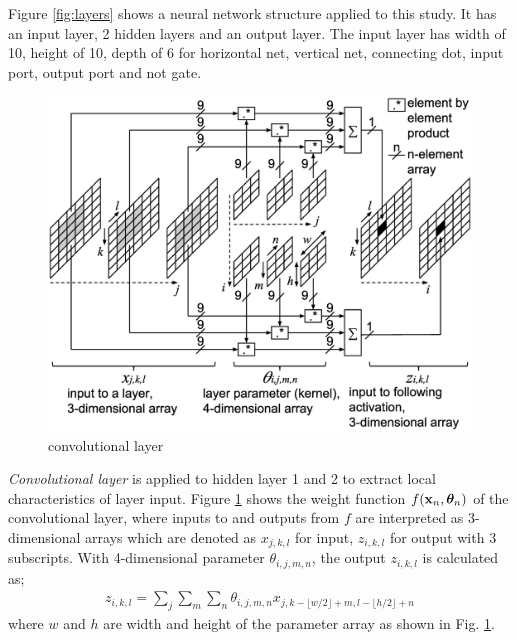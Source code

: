 \documentclass[twocolumn]{article}
\begin{document}
Figure \ref{fig:layers} shows a neural network structure
applied to this study.
It has an input layer, 2 hidden layers and an output layer.
The input layer has width of 10, height of 10,
depth of 6 for horizontal net, vertical net, connecting dot, input port,
output port and not gate.


\begin{figure}[!tb]
 \begin{center}
  \begin{minipage}{\hsize}
   \includegraphics[width=\hsize]{fig/layer_convolutional_03.eps}
   \caption{convolutional layer}
   \label{fig:layer_convolutional}
  \end{minipage}
 \end{center}
\end{figure}

{\it Convolutional layer} is applied to hidden layer 1 and 2
to extract local characteristics of layer input\cite{mit}.
Figure \ref{fig:layer_convolutional} shows the weight function
$f({\bf x}_n, {\bm \theta}_n)$ of the convolutional layer,
where inputs to and outputs from $f$ are interpreted as
3-dimensional arrays which are denoted as $x_{j,k,l}$ for input,
$z_{i,k,l}$ for output with 3 subscripts.
With 4-dimensional parameter $\theta_{i,j,m,n}$,
the output $z_{i,k,l}$ is calculated as;
\begin{eqnarray}
z_{i,k,l} = \sum_{j}\sum_{m}\sum_{n}
\theta_{i,j,m,n} x_{j,k - \lfloor w/2 \rfloor + m,l - \lfloor h/2 \rfloor + n}
\end{eqnarray}
where $w$ and $h$ are width and height of the parameter array
as shown in Fig. \ref{fig:layer_convolutional}.
\end{document}
